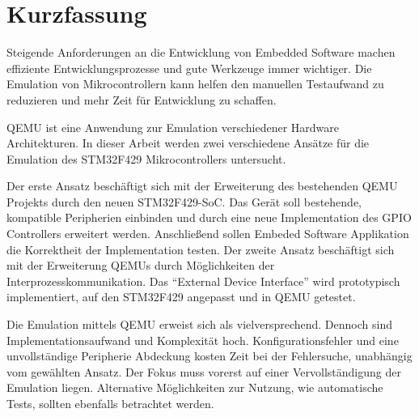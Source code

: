 

\clearpage
\chapter*{Kurzfassung}

Steigende Anforderungen an die Entwicklung von Embedded Software machen
effiziente Entwicklungsprozesse und gute Werkzeuge immer wichtiger.
Die Emulation von Mikrocontrollern kann helfen den manuellen Testaufwand zu
reduzieren und mehr Zeit für Entwicklung zu schaffen.

QEMU ist eine Anwendung zur Emulation verschiedener Hardware Architekturen.
In dieser Arbeit werden zwei verschiedene Ansätze für die Emulation des
STM32F429 Mikrocontrollers untersucht.

Der erste Ansatz beschäftigt sich mit der Erweiterung des bestehenden QEMU
Projekts durch den neuen STM32F429-SoC.
Das Gerät soll bestehende, kompatible Peripherien einbinden und durch eine neue
Implementation des GPIO Controllers erweitert werden.
Anschließend sollen Embeded Software Applikation die Korrektheit der
Implementation testen.
Der zweite Ansatz beschäftigt sich mit der Erweiterung QEMUs durch 
Möglichkeiten der Interprozesskommunikation.
Das \enquote{External Device Interface} wird prototypisch implementiert, auf
den STM32F429 angepasst und in QEMU getestet.

Die Emulation mittels QEMU erweist sich als vielversprechend.
Dennoch sind Implementationsaufwand und Komplexität hoch.
Konfigurationsfehler und eine unvollständige Peripherie Abdeckung kosten Zeit
bei der Fehlersuche, unabhängig vom gewählten Ansatz.
Der Fokus muss vorerst auf einer Vervollständigung der Emulation liegen.
Alternative Möglichkeiten zur Nutzung, wie automatische Tests, sollten
ebenfalls betrachtet werden.

